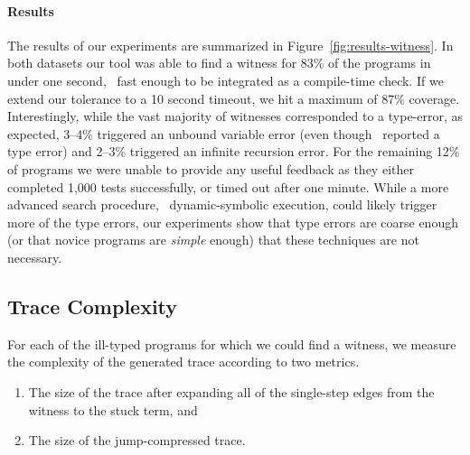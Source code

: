 \paragraph{Results}
\label{sec:results-witness}
The results of our experiments are summarized in
Figure~\ref{fig:results-witness}.
%
In both datasets our tool was able to find a witness for 83\% of the
programs in under one second, \ie\ fast enough to be integrated as a
compile-time check. If we extend our tolerance to a 10 second timeout,
we hit a maximum of 87\% coverage.
%
Interestingly, while the vast majority of witnesses corresponded to a
type-error, as expected, 3--4\% triggered an unbound variable error (even
though \ocaml\ reported a type error) and 2--3\% triggered an infinite
recursion error.
%
For the remaining 12\% of programs we were unable to provide any useful
feedback as they either completed 1,000 tests successfully, or timed out
after one minute.
%
%
While a more advanced search procedure, \eg\ dynamic-symbolic execution,
could likely trigger more of the type errors, our experiments show that
type errors are coarse enough (or that novice programs are \emph{simple}
enough) that these techniques are not necessary.


\subsection{Trace Complexity}
\label{sec:trace-complexity}

For each of the ill-typed programs for which we could
find a witness, we measure the complexity of the generated
trace according to two metrics.

%
\begin{enumerate}
\item {} The size of the trace after expanding
  all of the single-step edges from the witness to the stuck term, and
\item {} The size of the jump-compressed trace.
\end{enumerate}


